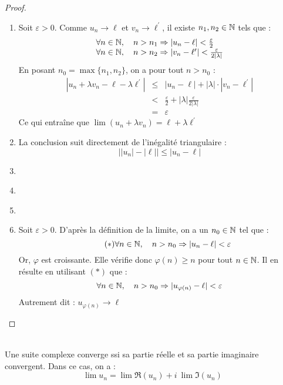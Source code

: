     \begin{proof}
        \ \\
        \begin{enumerate}[label=(\roman*)]
            \item Soit \(\varepsilon>0\). Comme \(u_n\to\ell \) et \(v_n \to \ell^{\prime}\), il existe \(n_1, n_2 \in \mathbb{N}\) tels que :
            \[
                \begin{array}{l}
                    \forall n \in \mathbb{N},\quad n > n_1 \Rightarrow |u_n - \ell| < \frac{\varepsilon}{2}\\
                    \forall n \in \mathbb{N},\quad n > n_2 \Rightarrow |v_n - \ell^{\prime}| < \frac{\varepsilon}{2|\lambda|}\\
                \end{array}    
            \]
            En posant \(n_0 = \max{\{n_1, n_2\}}\), on a pour tout \(n>n_0\) :
            \[
                \begin{array}{lcl}
                    |u_n + \lambda v_n - \ell - \lambda \ell^{\prime}| &\le& |u_n  - \ell| + |\lambda|\cdot|v_n - \ell^{\prime}|\\
                     &<& \frac{\varepsilon}{2} + |\lambda|\frac{\varepsilon}{2|\lambda|}\\
                     &=& \varepsilon
                \end{array}
            \]
            Ce qui entraîne que \(\lim (u_n + \lambda v_n) = \ell + \lambda \ell^{\prime}\) 
            
            \item La conclusion suit directement de l'inégalité triangulaire : \[\Big| |u_n| - |\ell| \Big| \le |u_n - \ell|\]
            \item \ 
            \item \ 
            \item \ 
            \item Soit \(\varepsilon > 0\). D'après la définition de la limite, on a un  \(n_0\in\mathbb{N}\) tel que : 
            \begin{equation*}
                \tag*{\((\ast)\)}
                \forall n \in \mathbb{N}, \quad n > n_0 \Rightarrow |u_n - \ell| < \varepsilon 
            \end{equation*}
            Or, \(\varphi\) est croissante. Elle vérifie donc \(\varphi(n) \ge n\) pour tout \(n\in\mathbb{N}\). Il en résulte en utilisant \((\ast)\) que :
            \[
                \forall n \in \mathbb{N}, \quad n > n_0 \Rightarrow |u_{\varphi(n)} - \ell| < \varepsilon     
            \]
            Autrement dit : \(u_{\varphi(n)} \to\ell \)
        \end{enumerate}
    \end{proof}

    \begin{corollary}\ \\
        Une suite complexe converge ssi sa partie réelle et sa partie imaginaire convergent. Dans ce cas, on a :
        \[\lim u_n = \lim \Re{(u_n)} + i\ \lim\Im{(u_n)}\] 
    \end{corollary}